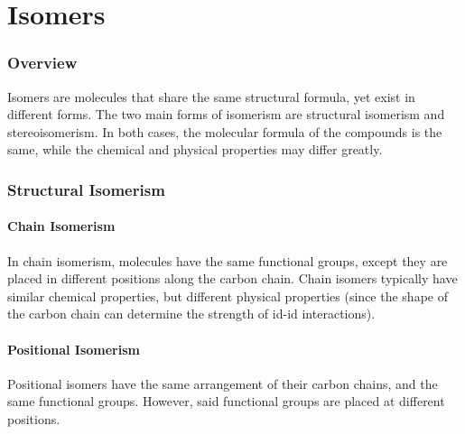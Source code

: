 

\pagebreak
\hypertarget{ChapterIsomers}{}
\part{Isomers}

	\section{Overview}

	Isomers are molecules that share the same structural formula, yet exist in different forms. The two main
	forms of isomerism are structural isomerism and stereoisomerism. In both cases, the molecular formula of the
	compounds is the same, while the chemical and physical properties may differ greatly.


	\section{Structural Isomerism}

		\subsection{Chain Isomerism}

			In chain isomerism, molecules have the same functional groups, except they are placed in different positions
			along the carbon chain. Chain isomers typically have similar chemical properties, but different physical
			properties (since the shape of the carbon chain can determine the strength of id-id interactions).





		\subsection{Positional Isomerism}
			Positional isomers have the same arrangement of their carbon chains, and the same functional groups. However, said
			functional groups are placed at different positions.


